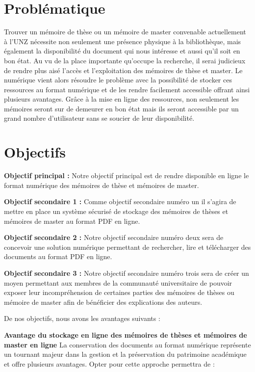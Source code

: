 \section{Problématique}

Trouver un mémoire de thèse ou un mémoire de master convenable actuellement à l'UNZ nécessite non seulement une présence physique à la bibliothèque, mais également la disponibilité du document qui nous intéresse et aussi qu'il soit en bon état. Au vu de la place importante qu'occupe la recherche, il serai judicieux de rendre plus aisé l'accès et l'exploitation des mémoires de thèse et master. Le numérique vient alors résoudre le problème avec la possibilité de stocker ces ressources au format numérique et de les rendre facilement accessible offrant ainsi plusieurs avantages. 
Grâce à la mise en ligne des ressources, non seulement les mémoires seront sur de demeurer en bon état mais ils seront accessible par un grand nombre d'utilisateur sans se soucier de leur disponibilité. 
\par
\section{Objectifs}
\textbf{Objectif principal :} Notre objectif principal est de rendre disponible en ligne le format numérique des mémoires de thèse et mémoires de master.

\textbf{Objectif secondaire 1 :} Comme objectif secondaire numéro un il s'agira de mettre en place un système sécurisé de stockage des mémoires de thèses et mémoires de master au format PDF en ligne.

\textbf{Objectif secondaire 2 :} Notre objectif secondaire numéro deux sera de concevoir une solution numérique permettant de rechercher, lire et télécharger des documents au format PDF en ligne.

\textbf{Objectif secondaire 3 :} Notre objectif secondaire numéro trois sera de créer un moyen permettant aux membres de la communauté universitaire de pouvoir exposer leur incompréhension de certaines parties des mémoires de thèses ou mémoire de master afin de bénéficier des explications des auteurs.
 \par
 
De nos objectifs, nous avons les avantages suivants :  
 
\textbf{Avantage du stockage en ligne des mémoires de thèses et mémoires de master en ligne}
La conservation des documents au format numérique représente un tournant majeur dans la gestion et la préservation du patrimoine académique et offre plusieurs avantages. Opter pour cette approche permettra de :\par

